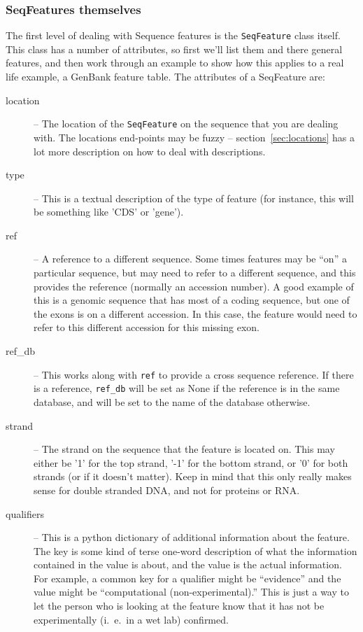 \documentclass{report}
\begin{document}
\subsubsection{SeqFeatures themselves}

The first level of dealing with Sequence features is the \verb|SeqFeature| class itself. This class has a number of attributes, so first we'll list them and there general features, and then work through an example to show how this applies to a real life example, a GenBank feature table. The attributes of a SeqFeature are:

\begin{description}
  \item[location] -- The location of the \verb|SeqFeature| on the sequence that you are dealing with. The locations end-points may be fuzzy -- section~\ref{sec:locations} has a lot more description on how to deal with descriptions.

  \item[type] -- This is a textual description of the type of feature (for instance, this will be something like 'CDS' or 'gene').

  \item[ref] -- A reference to a different sequence. Some times features may be ``on'' a particular sequence, but may need to refer to a different sequence, and this provides the reference (normally an accession number). A good example of this is a genomic sequence that has most of a coding sequence, but one of the exons is on a different accession. In this case, the feature would need to refer to this different accession for this missing exon.

  \item[ref\_db] -- This works along with \verb|ref| to provide a cross sequence reference. If there is a reference, \verb|ref_db| will be set as None if the reference is in the same database, and will be set to the name of the database otherwise.

  \item[strand] -- The strand on the sequence that the feature is located on. This may either be '1' for the top strand, '-1' for the bottom strand, or '0' for both strands (or if it doesn't matter). Keep in mind that this only really makes sense for double stranded DNA, and not for proteins or RNA.

  \item[qualifiers] -- This is a python dictionary of additional information about the feature. The key is some kind of terse one-word description of what the information contained in the value is about, and the value is the actual information. For example, a common key for a qualifier might be ``evidence'' and the value might be ``computational (non-experimental).'' This is just a way to let the person who is looking at the feature know that it has not be experimentally (i.~e.~in a wet lab) confirmed.
 


\end{description}
\end{document}
